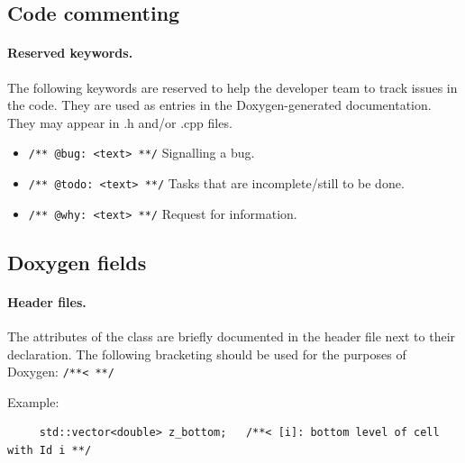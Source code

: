 \subsection{Code commenting}
%
%
\paragraph{Reserved keywords.}
The following keywords are reserved to help the developer team to track issues in the code. They are used as entries in the Doxygen-generated documentation. They may appear in .h and/or .cpp files.
\begin{itemize}
\item \texttt{/** @bug: <text> **/} Signalling a bug.
\item \texttt{/** @todo: <text> **/} Tasks that are incomplete/still to be done.
\item \texttt{/** @why: <text> **/} Request for information.

\end{itemize}

%
%
%
%
\subsection{Doxygen fields}
%
%
%
\paragraph{Header files.}
The attributes of the class are briefly documented in the header file next to their declaration. The following bracketing should be used for the purposes of Doxygen: \texttt{/**<  **/}

Example: 
\begin{verbatim}
     std::vector<double> z_bottom;   /**< [i]: bottom level of cell with Id i **/
\end{verbatim}
%
%
